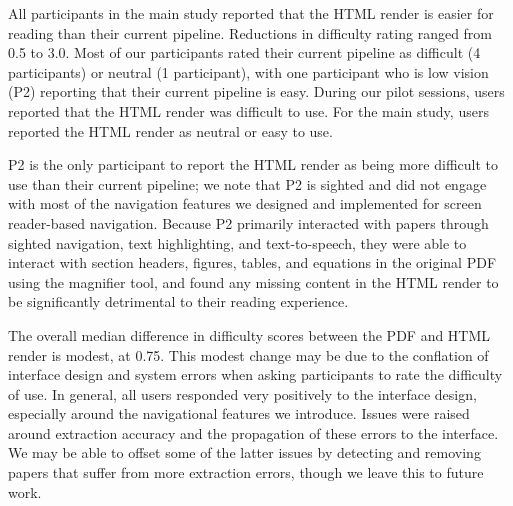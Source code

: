All participants in the main study reported that the HTML render is easier for reading than their current pipeline. Reductions in difficulty rating ranged from 0.5 to 3.0. Most of our participants rated their current pipeline as difficult (4 participants) or neutral (1 participant), with one participant who is low vision (P2) reporting that their current pipeline is easy. During our pilot sessions, users reported that the HTML render was difficult to use. For the main study, users reported the HTML render as neutral or easy to use.

P2 is the only participant to report the HTML render as being more difficult to use than their current pipeline; we note that P2 is sighted and did not engage with most of the navigation features we designed and implemented for screen reader-based navigation. Because P2 primarily interacted with papers through sighted navigation, text highlighting, and text-to-speech, they were able to interact with section headers, figures, tables, and equations in the original PDF using the magnifier tool, and found any missing content in the HTML render to be significantly detrimental to their reading experience.

The overall median difference in difficulty scores between the PDF and HTML render is modest, at 0.75. This modest change may be due to the conflation of interface design and system errors when asking participants to rate the difficulty of use. In general, all users responded very positively to the interface design, especially around the navigational features we introduce. Issues were raised around extraction accuracy and the propagation of these errors to the interface. We may be able to offset some of the latter issues by detecting and removing papers that suffer from more extraction errors, though we leave this to future work.

